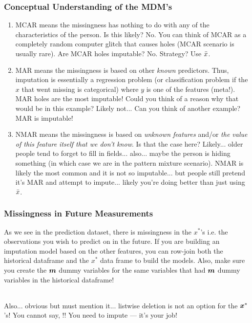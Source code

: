\documentclass[handout]{beamer}
\begin{document}
\begin{frame}\frametitle{Conceptual Understanding of the MDM's}
\vspace{-0.25cm}
\small
\begin{enumerate}
\item MCAR means the missingness has nothing to do with any of the characteristics of the person. Is this likely? \pause No. You can think of MCAR as a completely random computer glitch that causes holes (MCAR scenario is usually rare). Are MCAR holes imputable? \pause No. Strategy? \pause Use $\bar{x}$. \pause \vspace{-0.1cm}
\item MAR means the missingness is based on other \textit{known} predictors. Thus, imputation is essentially a regression problem (or classification problem if the $x$ that went missing is categorical) where $y$ is one of the features (meta!). MAR holes are the most imputable! \pause Could you think of a reason why that would be in this example? \pause Likely not... Can you think of another example? \pause MAR is imputable! \pause \vspace{-0.1cm}
\item NMAR means the missingness is based on \textit{unknown features} and/or \textit{the value of this feature itself that we don't know}. \pause Is that the case here? \pause Likely... older people tend to forget to fill in fields... also... maybe the person is hiding something (in which case we are in the pattern mixture scenario). \pause NMAR is likely the most common and it is not so imputable... \pause but people still pretend it's MAR and attempt to impute... likely you're doing better than just using $\bar{x}$.
\end{enumerate}
\end{frame}


\begin{frame}\frametitle{Missingness in Future Measurements}

As we see in the prediction dataset, there is missingness in the $x^*$'s i.e. the observations you wish to predict on in the future. \pause If you are building an imputation model based on the other features, you can row-join both the historical dataframe and the $x^*$ data frame to build the models. \pause Also, make sure you create the $\boldsymbol{m}$ dummy variables for the same variables that had $\boldsymbol{m}$ dummy variables in the historical dataframe! \\~\\ \pause

Also... obvious but must mention it... listwise deletion is not an option for the $\boldsymbol{x}^*$'s! You cannot say, !! You need to impute --- it's your job!

\end{frame}
\end{document}
